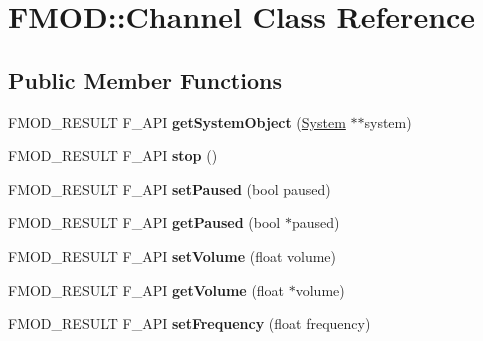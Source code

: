 \hypertarget{class_f_m_o_d_1_1_channel}{\section{F\-M\-O\-D\-:\-:Channel Class Reference}
\label{class_f_m_o_d_1_1_channel}
}
\subsection*{Public Member Functions}
\begin{DoxyCompactItemize}
\item 
\hypertarget{class_f_m_o_d_1_1_channel_ade71450e7b8a888d4a4f1e73eded4236}{F\-M\-O\-D\-\_\-\-R\-E\-S\-U\-L\-T F\-\_\-\-A\-P\-I {\bfseries get\-System\-Object} (\hyperlink{class_f_m_o_d_1_1_system}{System} $\ast$$\ast$system)}\label{class_f_m_o_d_1_1_channel_ade71450e7b8a888d4a4f1e73eded4236}

\item 
\hypertarget{class_f_m_o_d_1_1_channel_a89d7bc13ea65f29f306fbd279e54dd08}{F\-M\-O\-D\-\_\-\-R\-E\-S\-U\-L\-T F\-\_\-\-A\-P\-I {\bfseries stop} ()}\label{class_f_m_o_d_1_1_channel_a89d7bc13ea65f29f306fbd279e54dd08}

\item 
\hypertarget{class_f_m_o_d_1_1_channel_a7610d6be6beec8f7cf6d0230c48c6618}{F\-M\-O\-D\-\_\-\-R\-E\-S\-U\-L\-T F\-\_\-\-A\-P\-I {\bfseries set\-Paused} (bool paused)}\label{class_f_m_o_d_1_1_channel_a7610d6be6beec8f7cf6d0230c48c6618}

\item 
\hypertarget{class_f_m_o_d_1_1_channel_a551d39aed652cb419ce5ec7256abefb4}{F\-M\-O\-D\-\_\-\-R\-E\-S\-U\-L\-T F\-\_\-\-A\-P\-I {\bfseries get\-Paused} (bool $\ast$paused)}\label{class_f_m_o_d_1_1_channel_a551d39aed652cb419ce5ec7256abefb4}

\item 
\hypertarget{class_f_m_o_d_1_1_channel_a641ee780642531cec59aa9ec065d4709}{F\-M\-O\-D\-\_\-\-R\-E\-S\-U\-L\-T F\-\_\-\-A\-P\-I {\bfseries set\-Volume} (float volume)}\label{class_f_m_o_d_1_1_channel_a641ee780642531cec59aa9ec065d4709}

\item 
\hypertarget{class_f_m_o_d_1_1_channel_aef6f0675ac455547e3a00ce339ca85f9}{F\-M\-O\-D\-\_\-\-R\-E\-S\-U\-L\-T F\-\_\-\-A\-P\-I {\bfseries get\-Volume} (float $\ast$volume)}\label{class_f_m_o_d_1_1_channel_aef6f0675ac455547e3a00ce339ca85f9}

\item 
\hypertarget{class_f_m_o_d_1_1_channel_a355cd052a405c0ecdbaac7c65d24148b}{F\-M\-O\-D\-\_\-\-R\-E\-S\-U\-L\-T F\-\_\-\-A\-P\-I {\bfseries set\-Frequency} (float frequency)}\label{class_f_m_o_d_1_1_channel_a355cd052a405c0ecdbaac7c65d24148b}


\end{DoxyCompactItemize}
